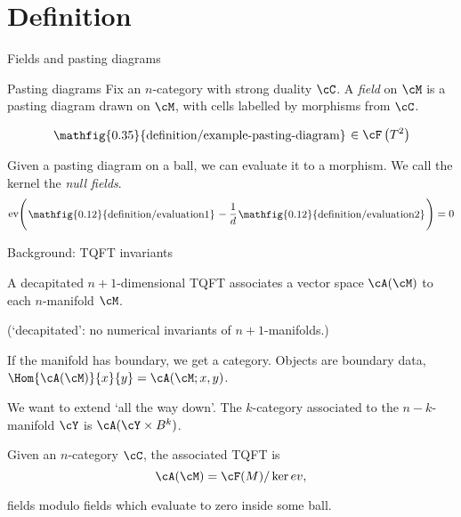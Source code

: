 \documentclass[beamer, compress]{beamer}
\begin{document}
\section{Definition}
\begin{frame}{Fields and pasting diagrams}
\begin{block}{Pasting diagrams}
Fix an $n$-category with strong duality $\cC$. A \emph{field} on $\cM$ is a pasting diagram drawn on $\cM$, with cells labelled by morphisms from $\cC$.
\end{block}
\begin{example}[$\cC = \text{TL}_d$ the Temperley-Lieb category]
$$\roundframe{\mathfig{0.35}{definition/example-pasting-diagram}} \in \cF\left(T^2\right)$$
\end{example}
\begin{block}{}
Given a pasting diagram on a ball, we can evaluate it to a morphism. We call the kernel the \emph{null fields}.
\vspace{-3mm}
$$\text{ev}\Bigg(\roundframe{\mathfig{0.12}{definition/evaluation1}} - \frac{1}{d}\roundframe{\mathfig{0.12}{definition/evaluation2}}\Bigg) = 0$$
\end{block}
\end{frame}

\begin{frame}{Background: TQFT invariants}
\begin{defn}
A decapitated $n+1$-dimensional TQFT associates a vector space $\cA(\cM)$ to each $n$-manifold $\cM$.
\end{defn}
(`decapitated': no numerical invariants of $n+1$-manifolds.)

\begin{block}{}
If the manifold has boundary, we get a category. Objects are boundary data, $\Hom{\cA(\cM)}{x}{y} = \cA(\cM; x,y)$.
\end{block}

\begin{block}{}
We want to extend `all the way down'. The $k$-category associated to the $n-k$-manifold $\cY$ is $\cA(\cY \times B^k)$.
\end{block}

\begin{defn}
Given an $n$-category $\cC$, the associated TQFT is 
\vspace{-3mm}
$$\cA(\cM) = \cF(M) / \ker{ev},$$

\vspace{-3mm}
fields modulo fields which evaluate to zero inside some ball.
\end{defn}
\end{frame}
\end{document}
